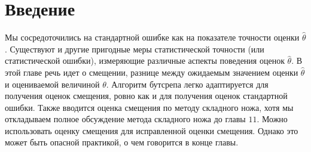 \section{Введение}

Мы сосредоточились на стандартной ошибке как на показателе точности оценки $\hat{\theta}$. Существуют и другие пригодные меры статистической точности (или статистической ошибки), измеряющие различные аспекты поведения оценок  $\hat{\theta}$. В этой главе речь идет о смещении, разнице между ожидаемым значением оценки $\hat{\theta}$ и оцениваемой величиной $\theta$. Алгоритм бутсрепа легко адаптируется для получения оценок смещения, ровно как и для получения оценок стандартной ошибки. Также вводится оценка смещения по методу складного ножа, хотя мы откладываем полное обсуждение метода складного ножа до главы $11$. Можно использовать оценку смещения для исправленной оценки смещения. Однако это может быть опасной практикой, о чем говорится в конце главы.

